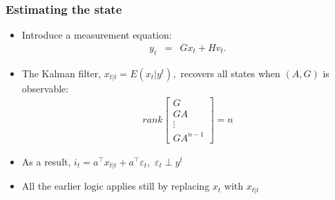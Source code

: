 \documentclass[handout]{beamer}
\begin{document}
\begin{frame}
\frametitle{Estimating the state}

\begin{itemize} %
    \item Introduce a measurement equation:
    \begin{eqnarray*}
    y_t &=& G x_t + H v_t .
\end{eqnarray*}
    \item The Kalman filter, ${x}_{t|t}=E(x_t|y^t),$ recovers all states when $(A,G)$ is observable:
    \begin{eqnarray*}
    rank
    \left[
    \begin{array}{c}
        G \\ G  A  \\ \vdots \\ G  A ^{n-1}
    \end{array}
    \right] =n
\end{eqnarray*}
\item As a result, $i_t=a^{\top}{x}_{t|t}+a^{\top}\varepsilon_t,$ $\varepsilon_t\perp y^t$
\item All the earlier logic applies still by replacing $x_t$ with ${x}_{t|t}$
\end{itemize}

\end{frame}
\end{document}

